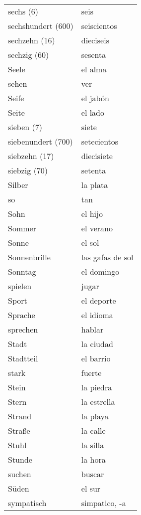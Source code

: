 \begin{longtable}{p{} p{}}
sechs (6) & seis\\
sechshundert (600) & seiscientos\\
sechzehn (16) & dieciseis\\
sechzig (60) & sesenta\\
Seele & el alma\\
sehen & ver\\
Seife & el jabón\\
Seite & el lado\\
sieben (7) & siete\\
siebenundert (700) & setecientos\\
siebzehn (17) & diecisiete\\
siebzig (70) & setenta\\
Silber & la plata\\
so & tan\\
Sohn & el hijo\\
Sommer & el verano\\
Sonne & el sol\\
Sonnenbrille & las gafas de sol\\
Sonntag & el domingo\\
spielen & jugar\\
Sport & el deporte\\
Sprache & el idioma\\
sprechen & hablar\\
Stadt & la ciudad\\
Stadtteil & el barrio\\
stark & fuerte\\
Stein & la piedra\\
Stern & la estrella\\
Strand & la playa\\
Straße & la calle\\
Stuhl & la silla\\
Stunde & la hora\\
suchen & buscar\\
Süden & el sur\\
sympatisch & simpatico, -a\\
\end{longtable}
